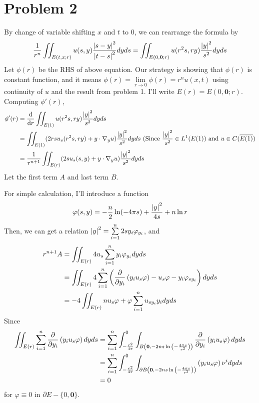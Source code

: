 \documentclass{article}
\begin{document}
\section*{Problem 2}
By change of variable shifting $x$ and $t$ to 0, we can rearrange the formula by \begin{equation*}
\frac{1}{r^n}\iint_{E(t,x;r)}u(s,y)\frac{\abs{s-y}^2}{\abs{t-s}^2}dyds=\iint_{E(0,\bm{0};r)}u(r^2s,ry)\frac{\abs{y}^2}{s^2}dyds
\end{equation*}
Let $\phi(r)$ be the RHS of above equation. Our strategy is showing that $\phi(r)$ is constant function, and it means $\phi(r)=\lim\limits_{r\rightarrow 0} \phi(r)=r^n u(x,t)$ using continuity of $u$ and the result from problem 1. I'll write $E(r)=E(0,\bm{0};r)$.
Computing $\phi'(r)$,
\begin{equation*}
\begin{split}
\phi'(r)&=\dv{r}\iint_{E(1)} u(r^2s,ry)\frac{\abs{y}^2}{s^2}dyds \\
&= \iint_{E(1)}(2rsu_s(r^2s, ry)+y\cdot \nabla_y u)\frac{\abs{y}^2}{s^2}dyds \text { (Since }\frac{\abs{y}^2}{s^2}\in L^1(E(1)) \text{ and } u\in C(\overline{E(1)}) \\
&= \frac{1}{r^{n+1}}\iint_{E(r)}(2su_s(s,y)+y\cdot \nabla_y u)\frac{\abs{y}^2}{s^2}dyds
\end{split}
\end{equation*}
Let the first term $A$ and last term $B$.

For simple calculation, I'll introduce a function
\begin{equation*}
\varphi(s, y)= -\frac{n}{2}\ln(-4\pi s)+\frac{\abs{y}^2}{4s}+n\ln r
\end{equation*}
Then, we can get a relation $\abs{y}^2=\sum\limits_{i=1}^n 2sy_i\varphi_{y_i}$, and
\begin{equation*}
\begin{split}
r^{n+1}A&=\iint_{E(r)} 4u_s \sum\limits_{i=1}^n y_i \varphi_{y_i} dyds \\
&=\iint_{E(r)} 4 \sum\limits_{i=1}^n \left(\pdv{y_i}\left(y_iu_s\varphi\right)-u_s\varphi-y_i\varphi_{sy_i}\right) dyds \\
&=-4\iint_{E(r)} nu_s\varphi + \varphi\sum\limits_{i=1}^n u_{sy_i} y_i  dyds
\end{split}
\end{equation*}
Since
\begin{equation*}
\begin{split}
\iint_{E(r)} \sum\limits_{i=1}^n \pdv{y_i}\left(y_i u_s\varphi\right) dyds&=\sum\limits_{i=1}^n \int_{-\frac{r^2}{4\pi}}^0 \int_{B\left(\bm{0}, -2ns \ln{\left(-\frac{4\pi s}{r^2}\right)}\right)}  \pdv{y_i}\left(y_i u_s\varphi\right) dyds \\
&=\sum\limits_{i=1}^n \int_{-\frac{r^2}{4\pi}}^0 \int_{\partial B\left(\bm{0}, -2ns \ln{\left(-\frac{4\pi s}{r^2}\right)}\right)}  \left(y_i u_s\varphi\right)\nu^i dyds \\
&=0
\end{split}
\end{equation*}
for $\varphi\equiv 0$ in $\partial E-\{0,\bm{0}\}$.
\end{document}
